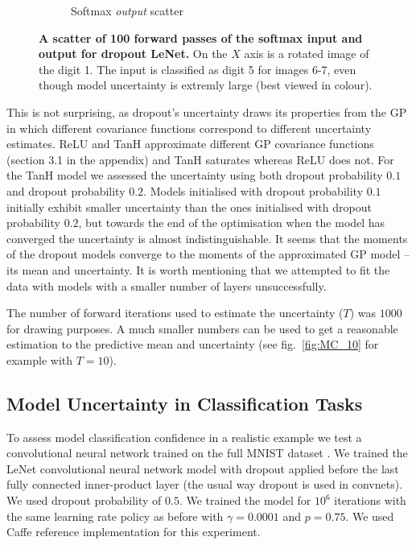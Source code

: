 \documentclass{article}
\theoremstyle{definition}
\begin{document}
\begin{figure}[t]
\begin{subfigure}[b]{0.5\textwidth}
		\caption{Softmax \textit{output} scatter} \label{fig:class_softmax_output}
	\end{subfigure}
	\caption{\textbf{A scatter of 100 forward passes of the softmax input and output for dropout LeNet.} On the $X$ axis is a rotated image of the digit 1. The input is classified as digit 5 for images 6-7, even though model uncertainty is extremly large (best viewed in colour).} \label{fig:class_softmax}
	\vspace{-4mm}
\end{figure}
This is not surprising, as dropout's uncertainty draws its properties from the GP in which different covariance functions correspond to different uncertainty estimates.
ReLU and TanH approximate different GP covariance functions (section 3.1 in the appendix) and TanH saturates whereas ReLU does not. 
For the TanH model we assessed the uncertainty using both dropout probability $0.1$ and dropout probability $0.2$. Models initialised with dropout probability $0.1$ initially exhibit smaller uncertainty than the ones initialised with dropout probability $0.2$, but towards the end of the optimisation when the model has converged the uncertainty is almost indistinguishable. It seems that the moments of the dropout models converge to the moments of the approximated GP model -- its mean and uncertainty.
It is worth mentioning that we attempted to fit the data with models with a smaller number of layers unsuccessfully.

The number of forward iterations used to estimate the uncertainty ($T$) was $1000$ for drawing purposes. A much smaller numbers can be used to get a reasonable estimation to the predictive mean and uncertainty (see fig.\ \ref{fig:MC_10} for example with $T=10$).

\subsection{Model Uncertainty in Classification Tasks}

To assess model classification confidence in a realistic example we test a convolutional neural network trained on the full MNIST dataset \citep{lecun1998mnist}.
We trained the LeNet convolutional neural network model \citep{lecun1998gradient} with dropout applied before the last fully connected inner-product layer (the usual way dropout is used in convnets). We used dropout probability of $0.5$. We trained the model for $10^6$ iterations with the same learning rate policy as before with $\gamma=0.0001$ and $p=0.75$. We used Caffe \citep{jia2014caffe} reference implementation for this experiment.
\end{document}
